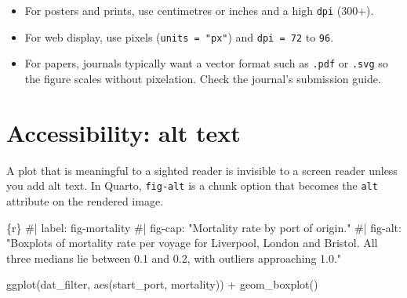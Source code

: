 \documentclass[
  english,
  letterpaper,
]{book}
\newenvironment{Shaded}{\begin{snugshade}}{\end{snugshade}}
\newcommand{\CommentTok}[1]{\textcolor[rgb]{0.37,0.37,0.37}{#1}}
\newcommand{\FunctionTok}[1]{\textcolor[rgb]{0.28,0.35,0.67}{#1}}
\newcommand{\InformationTok}[1]{\textcolor[rgb]{0.37,0.37,0.37}{#1}}
\newcommand{\NormalTok}[1]{\textcolor[rgb]{0.00,0.23,0.31}{#1}}
\newcommand{\SpecialCharTok}[1]{\textcolor[rgb]{0.37,0.37,0.37}{#1}}
\providecommand{\tightlist}{%
  \setlength{\itemsep}{0pt}\setlength{\parskip}{0pt}}
\begin{document}
\begin{tcolorbox}[enhanced jigsaw, colframe=quarto-callout-tip-color-frame, breakable, left=2mm, leftrule=.75mm, toptitle=1mm, rightrule=.15mm, opacitybacktitle=0.6, arc=.35mm, colback=white, title=\textcolor{quarto-callout-tip-color}{\faLightbulb}\hspace{0.5em}{Tip}, coltitle=black, colbacktitle=quarto-callout-tip-color!10!white, toprule=.15mm, bottomtitle=1mm, opacityback=0, titlerule=0mm, bottomrule=.15mm]

\begin{itemize}
\tightlist
\item
  For posters and prints, use centimetres or inches and a high
  \texttt{dpi} (300+).
\item
  For web display, use pixels (\texttt{units\ =\ "px"}) and
  \texttt{dpi\ =\ 72} to \texttt{96}.
\item
  For papers, journals typically want a vector format such as
  \texttt{.pdf} or \texttt{.svg} so the figure scales without
  pixelation. Check the journal's submission guide.
\end{itemize}

\end{tcolorbox}

\section{Accessibility: alt text}\label{accessibility-alt-text}

A plot that is meaningful to a sighted reader is invisible to a screen
reader unless you add alt text. In Quarto, \texttt{fig-alt} is a chunk
option that becomes the \texttt{alt} attribute on the rendered image.

\begin{Shaded}
\begin{Highlighting}[]
\InformationTok{\textasciigrave{}\textasciigrave{}\textasciigrave{}\{r\}}
\CommentTok{\#| label: fig{-}mortality}
\CommentTok{\#| fig{-}cap: "Mortality rate by port of origin."}
\CommentTok{\#| fig{-}alt: "Boxplots of mortality rate per voyage for Liverpool, London and Bristol. All three medians lie between 0.1 and 0.2, with outliers approaching 1.0."}

\FunctionTok{ggplot}\NormalTok{(dat\_filter, }\FunctionTok{aes}\NormalTok{(start\_port, mortality)) }\SpecialCharTok{+}
  \FunctionTok{geom\_boxplot}\NormalTok{()}
\InformationTok{\textasciigrave{}\textasciigrave{}\textasciigrave{}}
\end{Highlighting}
\end{Shaded}
\end{document}
